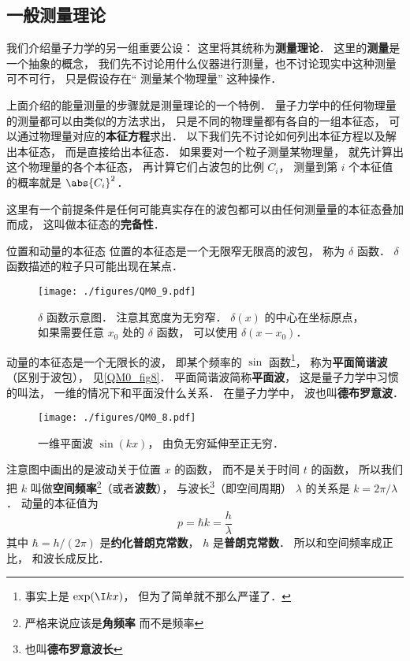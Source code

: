 \subsection{一般测量理论}
我们介绍量子力学的另一组重要公设： 这里将其统称为\textbf{测量理论}． 这里的\textbf{测量}是一个抽象的概念， 我们先不讨论用什么仪器进行测量，也不讨论现实中这种测量可不可行， 只是假设存在“ 测量某个物理量” 这种操作．

上面介绍的能量测量的步骤就是测量理论的一个特例． 量子力学中的任何物理量的测量都可以由类似的方法求出， 只是不同的物理量都有各自的一组本征态， 可以通过物理量对应的\textbf{本征方程}求出． 以下我们先不讨论如何列出本征方程以及解出本征态， 而是直接给出本征态． 如果要对一个粒子测量某物理量， 就先计算出这个物理量的各个本征态， 再计算它们占波包的比例 $C_i$， 测量到第 $i$ 个本征值的概率就是 $\abs{C_i}^2$．

这里有一个前提条件是任何可能真实存在的波包都可以由任何测量量的本征态叠加而成， 这叫做本征态的\textbf{完备性}．

\begin{example}{位置和动量的本征态}
位置的本征态是一个无限窄无限高的波包， 称为 $\delta$ 函数． $\delta$ 函数描述的粒子只可能出现在某点． 
\begin{figure}[ht]
\centering
\texttt{[image: ./figures/QM0\_9.pdf]}
\caption{$\delta$ 函数示意图． 注意其宽度为无穷窄． $\delta(x)$ 的中心在坐标原点， 如果需要任意 $x_0$ 处的 $\delta$ 函数， 可以使用 $\delta(x - x_0)$．} \label{QM0_fig9} %
\end{figure}

动量的本征态是一个无限长的波， 即某个频率的 $\sin$ 函数\footnote{事实上是 $\exp(\I kx)$， 但为了简单就不那么严谨了．}， 称为\textbf{平面简谐波}（区别于波包）， 见\autoref{QM0_fig8}． 平面简谐波简称\textbf{平面波}， 这是量子力学中习惯的叫法， 一维的情况下和平面没什么关系． 在量子力学中， 波也叫\textbf{德布罗意波}．

\begin{figure}[ht]
\centering
\texttt{[image: ./figures/QM0\_8.pdf]}
\caption{一维平面波 $\sin(kx)$， 由负无穷延伸至正无穷．} \label{QM0_fig8}
\end{figure}

注意图中画出的是波动关于位置 $x$ 的函数， 而不是关于时间 $t$ 的函数， 所以我们把 $k$ 叫做\textbf{空间频率}\footnote{严格来说应该是\textbf{角频率} 而不是频率}（或者\textbf{波数}）， %
与波长\footnote{也叫\textbf{德布罗意波长}}（即空间周期） $\lambda$ 的关系是 $k = 2\pi/\lambda$． 动量的本征值为
\begin{equation}\label{QM0_eq1}
p = \hbar k = \frac{h}{\lambda}
\end{equation}
其中 $\hbar = h / (2\pi)$ 是\textbf{约化普朗克常数}， $h$ 是\textbf{普朗克常数}． 所以和空间频率成正比， 和波长成反比．
\end{example}


